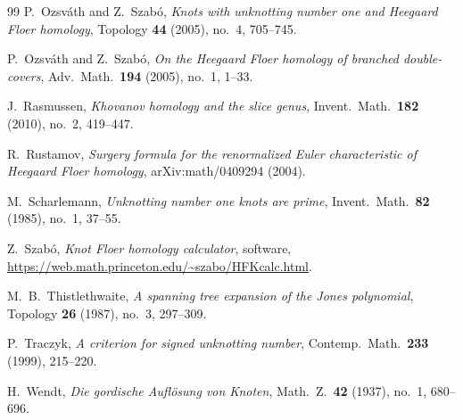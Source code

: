\documentclass[12pt, oneside]{amsart}
\begin{document}
\begin{thebibliography}{99}
     P.~Ozsv\'ath and Z.~Szab\'o, \emph{Knots with unknotting number one and
        Heegaard Floer homology}, Topology \textbf{44} (2005), no.~4, 705--745.

     P.~Ozsv\'ath and Z.~Szab\'o, \emph{On the Heegaard Floer homology
        of branched double-covers}, Adv.\ Math.\ \textbf{194} (2005), no.~1, 1--33.

     J.~Rasmussen, \emph{Khovanov homology and the slice genus},
    Invent.\ Math.\ \textbf{182} (2010), no.~2, 419--447.

     R.~Rustamov, \emph{Surgery formula for the renormalized Euler
    characteristic of Heegaard Floer homology}, arXiv:math/0409294 (2004).

     M.~Scharlemann, \emph{Unknotting number one knots are prime}, Invent.\
    Math.\ \textbf{82} (1985), no.~1, 37--55.


     Z.~Szab\'o, \emph{Knot Floer homology calculator}, software,
    \url{https://web.math.princeton.edu/~szabo/HFKcalc.html}.

     M.~B.~Thistlethwaite, \emph{A spanning tree expansion of the Jones
        polynomial}, Topology \textbf{26} (1987), no.~3, 297--309.

     P.~Traczyk, \emph{A criterion for signed unknotting number}, Contemp.\
    Math.\ \textbf{233} (1999), 215--220.

     H.~Wendt, \emph{Die gordische Aufl\"osung von Knoten}, Math.\ Z.\ \textbf{42}
    (1937), no.~1, 680--696.

\end{thebibliography}
\end{document}
